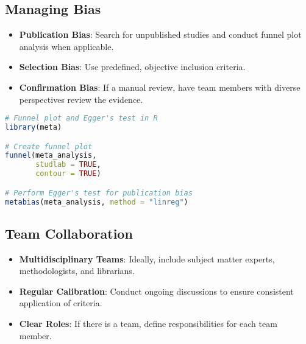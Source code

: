 \subsection{Managing Bias}

\begin{itemize}
    \item \textbf{Publication Bias}: Search for unpublished studies and conduct funnel plot analysis when applicable.

    \item \textbf{Selection Bias}: Use predefined, objective inclusion criteria.
    \item \textbf{Confirmation Bias}: If a manual review, have team members with diverse perspectives review the evidence.
\end{itemize}

\begin{commandbox}
\begin{lstlisting}[language=R]
# Funnel plot and Egger's test in R
library(meta)

# Create funnel plot
funnel(meta_analysis,
       studlab = TRUE,
       contour = TRUE)

# Perform Egger's test for publication bias
metabias(meta_analysis, method = "linreg")
\end{lstlisting}
\end{commandbox}

\subsection{Team Collaboration}

\begin{itemize}
    \item \textbf{Multidisciplinary Teams}: Ideally, include subject matter experts, methodologists, and librarians.
    \item \textbf{Regular Calibration}: Conduct ongoing discussions to ensure consistent application of criteria.
    \item \textbf{Clear Roles}: If there is a team, define responsibilities for each team member.
\end{itemize}

